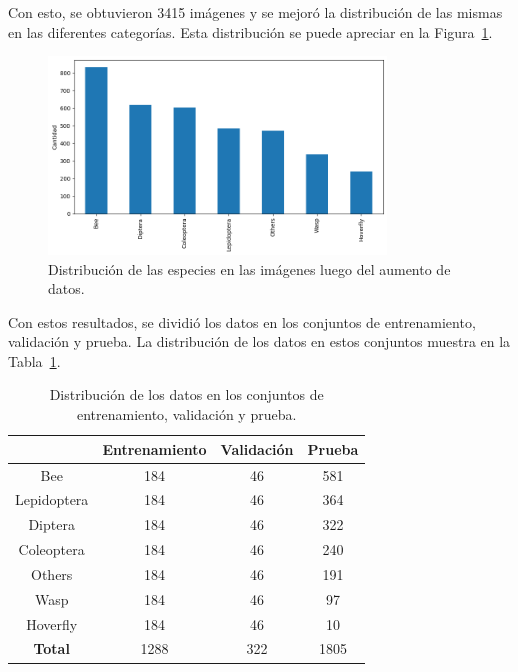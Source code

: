 Con esto, se obtuvieron 3415 imágenes y se mejoró la distribución de las mismas en las diferentes categorías. Esta distribución se puede apreciar en la Figura~\ref{fig:distribucion_especies_aumento}.

\begin{figure}[H]
    \centering
    \includegraphics[width=0.8\textwidth]{Figuras/distribucion_especies_aumento.png}
    \caption{Distribución de las especies en las imágenes luego del aumento de datos.}
    \label{fig:distribucion_especies_aumento}
\end{figure}

Con estos resultados, se dividió los datos en los conjuntos de entrenamiento, validación y prueba. La distribución de los datos en estos conjuntos muestra en la Tabla~\ref{tab:distribucion_conjuntos}.

\begin{table}[H]
    \centering\small
    \begin{tabular}{cccc}
        \toprule
         & \textbf{Entrenamiento} & \textbf{Validación} & \textbf{Prueba} \\
        \midrule
        {Bee} 
        & 184 & 46 & 581 \\
        {Lepidoptera} 
        & 184 & 46 & 364 \\
        {Diptera} 
        & 184 & 46 & 322 \\
        {Coleoptera} 
        & 184 & 46 & 240 \\
        {Others} 
        & 184 & 46 & 191 \\
        {Wasp} 
        & 184 & 46 & 97 \\
        {Hoverfly} 
        & 184 & 46 & 10 \\
        \midrule
        \textbf{Total}
        & 1288 & 322 & 1805 \\
        \bottomrule
    \end{tabular}
    \caption{Distribución de los datos en los conjuntos de entrenamiento, validación y prueba.}
    \label{tab:distribucion_conjuntos}
\end{table}

